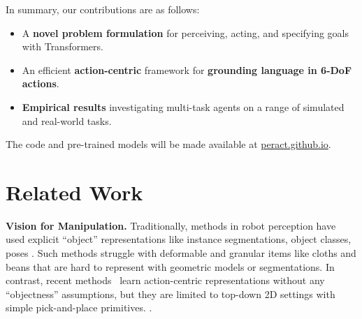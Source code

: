 In summary, our contributions are as follows:
\vspace{-0.2em}
\begin{itemize}[leftmargin=0.8cm,itemsep=0.05em]
    \item A \textbf{novel problem formulation} for perceiving, acting, and specifying goals with Transformers.
    \item An efficient \textbf{action-centric} framework for \textbf{grounding language in 6-DoF actions}.
    \item \textbf{Empirical results} investigating multi-task agents on a range of simulated and real-world tasks. 
\end{itemize}
The code and pre-trained models will be made available  at \url{peract.github.io}. 

\section{Related Work}
\label{sec:related_work}
\textbf{Vision for Manipulation.} Traditionally, methods in robot perception have used explicit ``object'' representations like instance segmentations, object classes, poses  \citep{he2017mask,Xiang-RSS-18,zhu2014single,zeng2017multi,deng2020self,xie2020best}. Such methods struggle with deformable and granular items like cloths and beans that are hard to represent with geometric models or segmentations. 
In contrast, recent methods~\citep{zeng2019robotic,zengTransporterNetworksRearranging2021,cliport,stengel2022guiding} learn action-centric representations without any ``objectness'' assumptions, but they are limited to top-down 2D settings with simple pick-and-place primitives. . 

